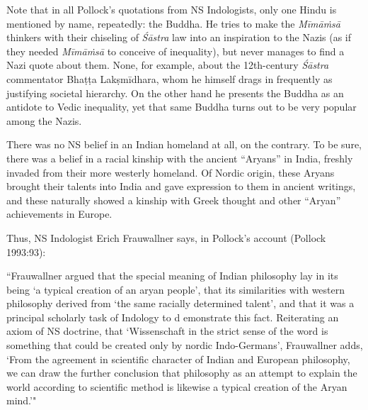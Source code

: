 Note that in all Pollock’s quotations from NS Indologists, only one Hindu is mentioned by name, repeatedly: the Buddha. He tries to make the {\sl Mīmāṁsā} thinkers with their chiseling of {\sl Śāstra} law into an inspiration to the Nazis (as if they needed {\sl Mīmāṁsā} to conceive of inequality), but never manages to find a Nazi quote about them. None, for example, about the 12th-century {\sl Śāstra} commentator Bhaṭṭa Lakṣmīdhara, whom he himself drags in frequently as justifying societal hierarchy. On the other hand he presents the Buddha as an antidote to Vedic inequality, yet that same Buddha turns out to be very popular among the Nazis.

There was no NS belief in an Indian homeland at all, on the contrary. To be sure, there was a belief in a racial kinship with the ancient “Aryans” in India, freshly invaded from their more westerly homeland. Of Nordic origin, these Aryans brought their talents into India and gave expression to them in ancient writings, and these naturally showed a kinship with Greek thought and other “Aryan” achievements in Europe.

Thus, NS Indologist Erich Frauwallner says, in Pollock’s account (Pollock 1993:93): 
\newpage

\begin{myquote}
“Frauwallner argued that the special meaning of Indian philosophy lay in its being ‘a typical creation of an aryan people’, that its similarities with western philosophy derived from ‘the same racially determined talent’, and that it was a principal scholarly task of Indology to d emonstrate this fact. Reiterating an axiom of NS doctrine, that ‘Wissenschaft in the strict sense of the word is something that could be created only by nordic Indo-Germans’, Frauwallner adds, ‘From the agreement in scientific character of Indian and European philosophy, we can draw the further conclusion that philosophy as an attempt to explain the world according to scientific method is likewise a typical creation of the Aryan mind.’"
\end{myquote}

